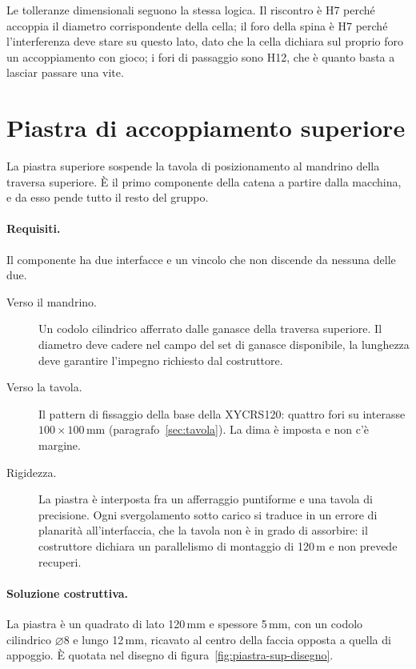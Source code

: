 Le tolleranze dimensionali seguono la stessa logica. Il riscontro è H7 perché
accoppia il diametro corrispondente della cella; il foro della spina è H7 perché
l'interferenza deve stare su questo lato, dato che la cella dichiara sul proprio
foro un accoppiamento con gioco; i fori di passaggio sono H12, che è quanto
basta a lasciar passare una vite.

\section{Piastra di accoppiamento superiore}
\label{sec:piastra-superiore}

La piastra superiore sospende la tavola di posizionamento al mandrino della
traversa superiore. È il primo componente della catena a partire dalla macchina,
e da esso pende tutto il resto del gruppo.

\paragraph{Requisiti.}
Il componente ha due interfacce e un vincolo che non discende da nessuna delle
due.

\begin{description}
  \item[Verso il mandrino.] Un codolo cilindrico afferrato dalle ganasce della
    traversa superiore. Il diametro deve cadere nel campo del set di ganasce
    disponibile, la lunghezza deve garantire l'impegno richiesto dal
    costruttore.
  \item[Verso la tavola.] Il pattern di fissaggio della base della
    XYCRS120: quattro fori su interasse $100 \times 100$\,mm
    (paragrafo~\ref{sec:tavola}). La dima è imposta e non c'è margine.
  \item[Rigidezza.] La piastra è interposta fra un afferraggio puntiforme e una
    tavola di precisione. Ogni svergolamento sotto carico si traduce in un
    errore di planarità all'interfaccia, che la tavola non è in grado di
    assorbire: il costruttore dichiara un parallelismo di montaggio di
    120\,\textmu m e non prevede recuperi.
\end{description}

\paragraph{Soluzione costruttiva.}
La piastra è un quadrato di lato 120\,mm e spessore 5\,mm, con un codolo
cilindrico $\varnothing$8 e lungo 12\,mm, ricavato al centro della faccia
opposta a quella di appoggio. È quotata nel disegno di
figura~\ref{fig:piastra-sup-disegno}.

